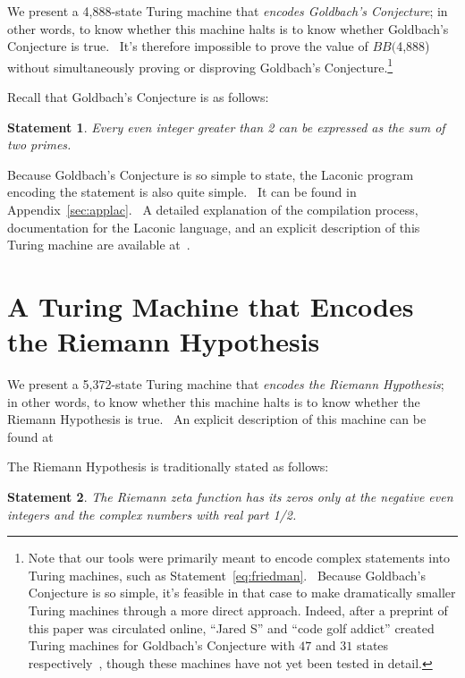 \documentclass[11pt]{article}
\newtheorem{statement}{Statement}
\newcommand{\gbstatenumstate}{4,888-state }
\newcommand{\bbgbstatenum}{$BB($4,888) }
\newcommand{\rmstatenumstate}{5,372-state }
\begin{document}
We present a \gbstatenumstate Turing machine that \emph{encodes Goldbach's Conjecture}; in other words, to know whether this machine halts is to know whether Goldbach's Conjecture is true. \ It's therefore impossible to prove the value of \bbgbstatenum without simultaneously proving or disproving Goldbach's Conjecture.\footnote{Note that our tools were primarily meant to encode complex statements into Turing machines, such as Statement~\ref{eq:friedman}. \ Because Goldbach's Conjecture is so simple, it's feasible in that case to make dramatically smaller Turing machines through a more direct approach.  Indeed, after a preprint of this paper was circulated online, ``Jared S'' and ``code golf addict'' created Turing machines for Goldbach's Conjecture with $47$ and $31$ states respectively~\cite{comments}, though these machines have not yet been tested in detail.}

Recall that Goldbach's Conjecture is as follows:

\begin{statement}
\emph{Every even integer greater than 2 can be expressed as the sum of two primes.}
\label{goldbachstatement}
\end{statement}

Because Goldbach's Conjecture is so simple to state, the Laconic program encoding the statement is also quite simple. \ It can be found in Appendix~\ref{sec:applac}. \ A detailed explanation of the compilation process, documentation for the Laconic language, and an explicit description of this Turing machine are available at~\cite{github}.

\section{A Turing Machine that Encodes the Riemann Hypothesis}

We present a \rmstatenumstate Turing machine that \emph{encodes the Riemann Hypothesis}; in other words, to know whether this machine halts is to know whether the Riemann Hypothesis is true. \ An explicit description of this machine can be found at~\cite{github}

The Riemann Hypothesis is traditionally stated as follows:

\begin{statement}
\emph{The Riemann zeta function has its zeros only at the negative even integers and the complex numbers with real part 1/2.}
\label{goldbachstatement}
\end{statement}
\end{document}
